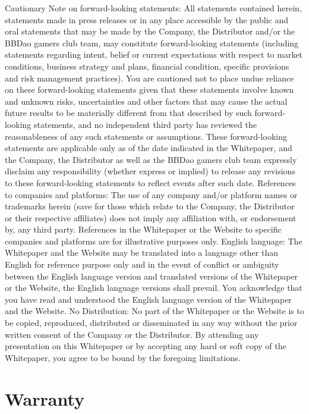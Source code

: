 \documentclass[
]{book}
\begin{document}
Cautionary Note on forward-looking statements: All statements contained herein, statements made in press releases or in any place accessible by the public and oral statements that may be made by the Company, the Distributor and/or the BBDao gamers club team, may constitute forward-looking statements (including statements regarding intent, belief or current expectations with respect to market conditions, business strategy and plans, financial condition, specific provisions and risk management practices). You are cautioned not to place undue reliance on these forward-looking statements given that these statements involve known and unknown risks, uncertainties and other factors that may cause the actual future results to be materially different from that described by such forward-looking statements, and no independent third party has reviewed the reasonableness of any such statements or assumptions. These forward-looking statements are applicable only as of the date indicated in the Whitepaper, and the Company, the Distributor as well as the BBDao gamers club team expressly disclaim any responsibility (whether express or implied) to release any revisions to these forward-looking statements to reflect events after such date.
References to companies and platforms: The use of any company and/or platform names or trademarks herein (save for those which relate to the Company, the Distributor or their respective affiliates) does not imply any affiliation with, or endorsement by, any third party. References in the Whitepaper or the Website to specific companies and platforms are for illustrative purposes only.
English language: The Whitepaper and the Website may be translated into a language other than English for reference purpose only and in the event of conflict or ambiguity between the English language version and translated versions of the Whitepaper or the Website, the English language versions shall prevail. You acknowledge that you have read and understood the English language version of the Whitepaper and the Website.
No Distribution: No part of the Whitepaper or the Website is to be copied, reproduced, distributed or disseminated in any way without the prior written consent of the Company or the Distributor. By attending any presentation on this Whitepaper or by accepting any hard or soft copy of the Whitepaper, you agree to be bound by the foregoing limitations.

\hypertarget{warranty}{%
\section{Warranty}\label{warranty}}
\end{document}
